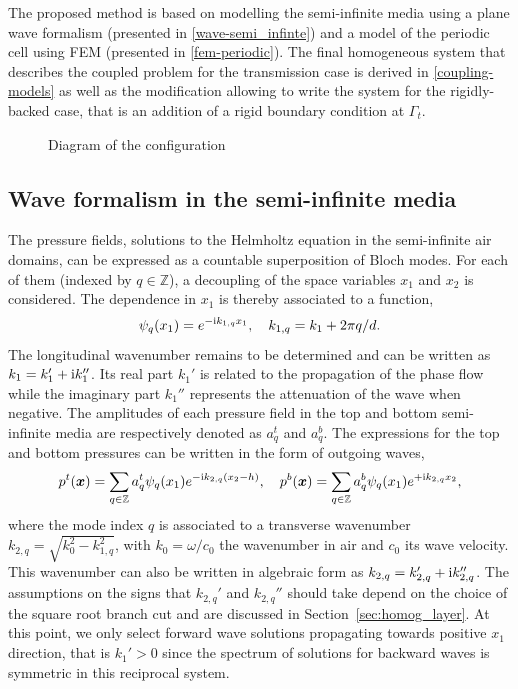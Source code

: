 The proposed method is based on modelling the semi-infinite media using a plane wave formalism (presented in \cref{wave-semi_infinte}) and a model of the periodic cell using FEM (presented in \cref{fem-periodic}). The final homogeneous system that describes the coupled problem for the transmission case is derived in \cref{coupling-models} as well as the modification allowing to write the system for the rigidly-backed case, that is an addition of a rigid boundary condition at $\Gamma_t$.

\begin{figure}[htpb]
    \centering
    
    \caption{Diagram of the configuration}
    \label{fig:schema}
\end{figure}


\subsection{\label{wave-semi_infinte}Wave formalism in the semi-infinite media}

The pressure fields, solutions to the Helmholtz equation in the semi-infinite air domains, can be expressed as a countable superposition of Bloch modes. For each of them (indexed by $q\in\mathbb Z$), a decoupling of the space variables $x_1$ and $x_2$ is considered. The dependence in $x_1$ is thereby associated to a function,
\begin{equation}
\psi_q(x_1) = e^{-\mathrm i k_{1,q} x_1},\quad k_{1, q} = k_1 + 2 \pi q / d. 
\end{equation}
The longitudinal wavenumber remains to be determined and can be written as $k_1 = k_1'+\mathrm i k_1''$. Its real part $k_1'$ is related to the propagation of the phase flow while the imaginary part $k_1''$ represents the attenuation of the wave when negative. The amplitudes of each pressure field in the top and bottom semi-infinite media are respectively denoted as $a^t_q$ and $a^b_q$. The expressions for the top and bottom pressures can be written in the form of outgoing waves,
\begin{equation}
        p^t(\boldsymbol x) = \sum_{q \in \mathbb Z} a^{t}_q \psi_q(x_1) e^{ - \mathrm i k_{2, q} (x_2 - h)}, \quad p^b(\boldsymbol x) = \sum_{q \in \mathbb Z} a^{b}_q \psi_q(x_1) e^{+ \mathrm i k_{2, q} x_2},
    \label{eq:out_waves}
\end{equation}
where the mode index $q$ is associated to a transverse wavenumber $k_{2, q} =  \sqrt{k^2_{0} - k^2_{1, q}} $, with $k_{0} = \omega / c_0$ the wavenumber in air and $c_0$ its wave velocity. This wavenumber can also be written in algebraic form as $k_{2, q}= k_{2, q}' + \mathrm i k_{2, q}''$. The assumptions on the signs that $k_{2,q}'$ and $k_{2,q}''$ should take depend on the choice of the square root branch cut and are discussed in Section~\ref{sec:homog_layer}. At this point, we only select forward wave solutions propagating towards positive $x_1$ direction, that is $k_1' > 0$ since the spectrum of solutions for backward waves is symmetric in this reciprocal system. \\


